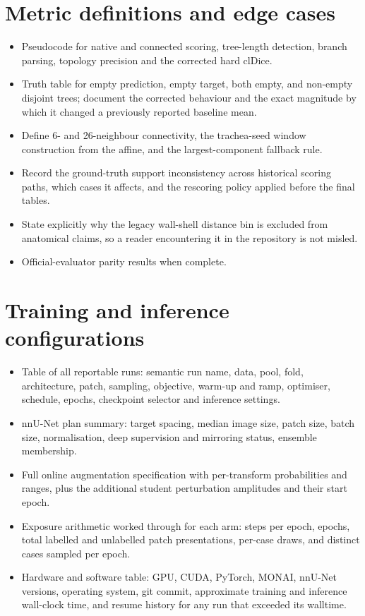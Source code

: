 \section{Metric definitions and edge cases}

\begin{itemize}
  \item Pseudocode for native and connected scoring, tree-length detection, branch parsing,
  topology precision and the corrected hard clDice.
  \item Truth table for empty prediction, empty target, both empty, and non-empty disjoint
  trees; document the corrected behaviour and the exact magnitude by which it changed a
  previously reported baseline mean.
  \item Define 6- and 26-neighbour connectivity, the trachea-seed window construction from
  the affine, and the largest-component fallback rule.
  \item Record the ground-truth support inconsistency across historical scoring paths, which
  cases it affects, and the rescoring policy applied before the final tables.
  \item State explicitly why the legacy wall-shell distance bin is excluded from anatomical
  claims, so a reader encountering it in the repository is not misled.
  \item Official-evaluator parity results when complete.
\end{itemize}

\section{Training and inference configurations}

\begin{itemize}
  \item Table of all reportable runs: semantic run name, data, pool, fold, architecture,
  patch, sampling, objective, warm-up and ramp, optimiser, schedule, epochs, checkpoint
  selector and inference settings.
  \item nnU-Net plan summary: target spacing, median image size, patch size, batch size,
  normalisation, deep supervision and mirroring status, ensemble membership.
  \item Full online augmentation specification with per-transform probabilities and ranges,
  plus the additional student perturbation amplitudes and their start epoch.
  \item Exposure arithmetic worked through for each arm: steps per epoch, epochs, total
  labelled and unlabelled patch presentations, per-case draws, and distinct cases sampled per
  epoch.
  \item Hardware and software table: GPU, CUDA, PyTorch, MONAI, nnU-Net versions, operating
  system, git commit, approximate training and inference wall-clock time, and resume history
  for any run that exceeded its walltime.
\end{itemize}

